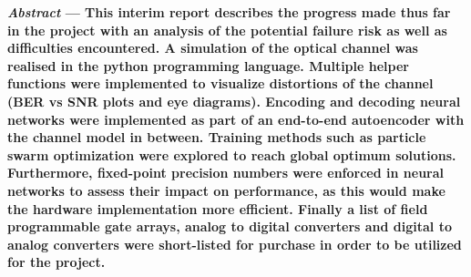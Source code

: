 
\iffalse

- What is the topic of work
- Why are we doing it? (Motivations/Novelty)
- Does this work appear in the literature and if so, what are we doing differently?
- How well is work proceeding?
- Any key results

\fi

\textbf{\textit{Abstract} --- This interim report describes the progress made thus far in the project with an analysis of the potential failure risk as well as difficulties encountered. A simulation of the optical channel was realised in the python programming language. Multiple helper functions were implemented to visualize distortions of the channel (BER vs SNR plots and eye diagrams). Encoding and decoding neural networks were implemented as part of an end-to-end autoencoder with the channel model in between. Training methods such as particle swarm optimization were explored to reach global optimum solutions. Furthermore, fixed-point precision numbers were enforced in neural networks to assess their impact on performance, as this would make the hardware implementation more efficient. Finally a list of field programmable gate arrays, analog to digital converters and digital to analog converters were short-listed for purchase in order to be utilized for the project.}